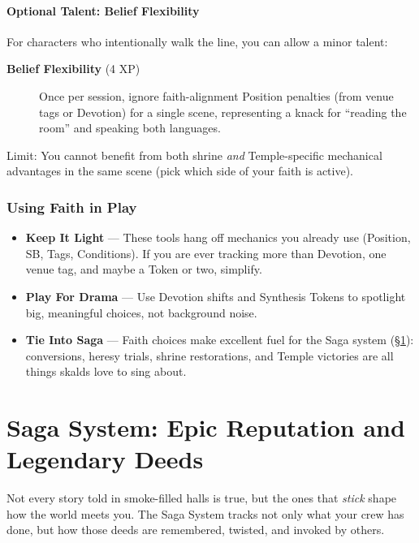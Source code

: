 \documentclass[11pt]{article}
\begin{document}
\paragraph*{Optional Talent: Belief Flexibility}
For characters who intentionally walk the line, you can allow a minor talent:

\begin{description}
  \item[\textbf{Belief Flexibility} (4 XP)] Once per session, ignore faith-alignment Position
    penalties (from venue tags or Devotion) for a single scene, representing a knack for ``reading
    the room'' and speaking both languages.
\end{description}

Limit: You cannot benefit from both shrine \emph{and} Temple-specific mechanical advantages in the
same scene (pick which side of your faith is active).

\subsubsection*{Using Faith in Play}

\begin{itemize}
  \item \textbf{Keep It Light} --- These tools hang off mechanics you already use (Position, SB,
        Tags, Conditions). If you are ever tracking more than Devotion, one venue tag, and maybe a
        Token or two, simplify.
  \item \textbf{Play For Drama} --- Use Devotion shifts and Synthesis Tokens to spotlight big,
        meaningful choices, not background noise.
  \item \textbf{Tie Into Saga} --- Faith choices make excellent fuel for the Saga system
        (\S\ref{sec:saga-system}): conversions, heresy trials, shrine restorations, and Temple
        victories are all things skalds love to sing about.
\end{itemize}

\section{Saga System: Epic Reputation and Legendary Deeds}
\label{sec:saga-system}

Not every story told in smoke-filled halls is true, but the ones that \emph{stick} shape how the
world meets you. The Saga System tracks not only what your crew has done, but how those deeds are
remembered, twisted, and invoked by others.
\end{document}
